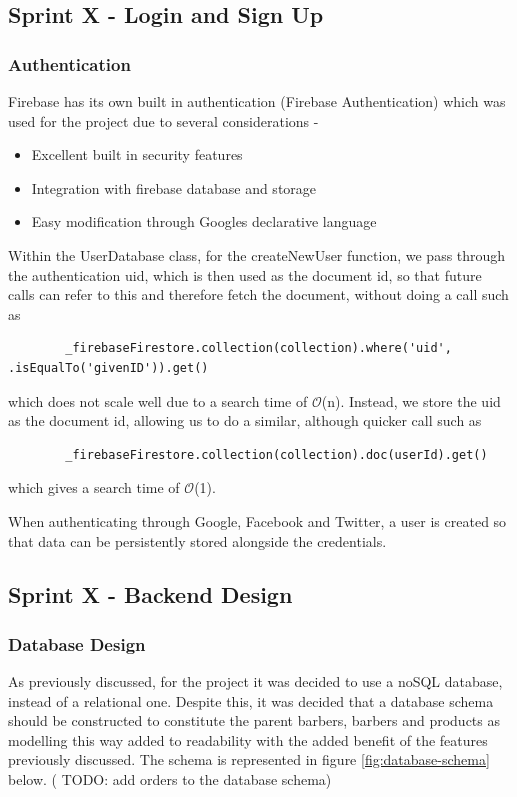 \documentclass[12pt]{article}
\begin{document}
	\subsection{Sprint X - Login and Sign Up}
	
	\subsubsection{Authentication}
	\label{authentication}
	Firebase has its own built in authentication (Firebase Authentication) which was used for the project due to several considerations -
	\begin{itemize}
		\item Excellent built in security features
		\item Integration with firebase database and storage
		\item Easy modification through Googles declarative language
	\end{itemize}
	Within the UserDatabase class, for the createNewUser function, we pass through the authentication uid, which is then used as the document id, so that future calls can refer to this and therefore fetch the document, without doing a call such as 
	\begin{lstlisting}
		_firebaseFirestore.collection(collection).where('uid', .isEqualTo('givenID')).get()
	\end{lstlisting}
	which does not scale well due to a search time of $\mathcal{O}$(n). Instead, we store the uid as the document id, allowing us to do a similar, although quicker call such as
	\begin{lstlisting}
		_firebaseFirestore.collection(collection).doc(userId).get()
	\end{lstlisting}
	which gives a search time of $\mathcal{O}$(1).
	
	When authenticating through Google, Facebook and Twitter, a user is created so that data can be persistently stored alongside the credentials.
	
	
	\subsection{Sprint X - Backend Design}
	
	\subsubsection{Database Design}
	As previously discussed, for the project it was decided to use a noSQL database, instead of a relational one. Despite this, it was decided that a database schema should be constructed to constitute the parent barbers, barbers and products as modelling this way added to readability with the added benefit of the features previously discussed. The schema is represented in figure \ref{fig:database-schema} below.
	( TODO: add orders to the database schema)
	
\end{document}
